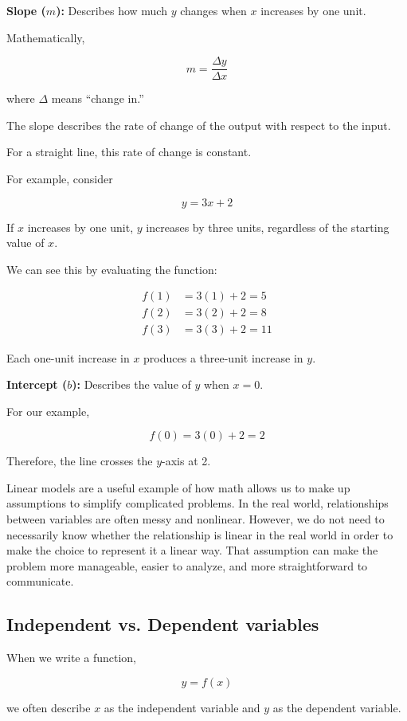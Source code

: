 \documentclass[12pt]{article}
\begin{document}
\textbf{Slope ($m$):} Describes how much $y$ changes when $x$ increases by one unit.

Mathematically,

\[
m=\frac{\Delta y}{\Delta x}
\]

where $\Delta$ means ``change in.''

The slope describes the rate of change of the output with respect to the input.

For a straight line, this rate of change is constant.

For example, consider

\[
y=3x+2
\]

If $x$ increases by one unit, $y$ increases by three units, regardless of the starting value of $x$.

We can see this by evaluating the function:

\begin{align*}
f(1)&=3(1)+2=5\\
f(2)&=3(2)+2=8\\
f(3)&=3(3)+2=11
\end{align*}

Each one-unit increase in $x$ produces a three-unit increase in $y$.

\textbf{Intercept ($b$):} Describes the value of $y$ when $x=0$.

For our example,

\[
f(0)=3(0)+2=2
\]

Therefore, the line crosses the $y$-axis at 2.

Linear models are a useful example of how math allows us to make up assumptions to simplify complicated problems. In the real world, relationships between variables are often messy and nonlinear. However, we do not need to necessarily know whether the relationship is linear in the real world in order to make the choice to represent it a linear way. That assumption can make the problem more manageable, easier to analyze, and more straightforward to communicate.

\subsection{Independent vs. Dependent variables}

When we write a function,

\[
y=f(x)
\]

we often describe $x$ as the independent variable and $y$ as the dependent variable.
\end{document}
